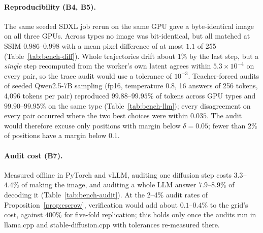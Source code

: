 \documentclass[11pt,a4paper]{article}
\theoremstyle{definition}
\theoremstyle{plain}
\begin{document}
\begin{table}[ht]
\centering
\caption{SDXL across GPU types (4 prompts, fixed seeds, CPU-generated initial noise). The last column
is the largest relative error when one GPU recomputes a single denoising step of another GPU's trace.}\label{tab:bench-diff}
\small
\resizebox{\linewidth}{!}{}
\medskip
\caption{Cost of one audit (B7). Diffusion: recomputing one denoising step, as a fraction of generating
the image. LLM: one teacher-forced pass (fp16) over a 256-token answer, as a fraction of vLLM decoding the
same number of tokens at batch 1 (4-bit AWQ, Table~\ref{tab:bench-throughput}); an fp16 decode would make the
fraction smaller.}\label{tab:bench-audit}
\small
\resizebox{\linewidth}{!}{}
\end{table}

\paragraph{Reproducibility (B4, B5).} The same seeded SDXL job rerun on the same GPU gave a byte-identical image
on all three GPUs. Across types no image was bit-identical, but all matched at SSIM $0.986$--$0.998$ with a mean
pixel difference of at most $1.1$ of 255 (Table~\ref{tab:bench-diff}). Whole trajectories drift about $1\%$ by
the last step, but a \emph{single} step recomputed from the worker's own latent agrees within
$5.3\times10^{-4}$ on every pair, so the trace audit would use a tolerance of $10^{-3}$. Teacher-forced audits of
seeded Qwen2.5-7B sampling (fp16, temperature 0.8, 16 answers of 256 tokens, 4{,}096 tokens per pair)
reproduced $99.88$--$99.95\%$ of tokens across GPU types and $99.90$--$99.95\%$ on the same type
(Table~\ref{tab:bench-llm}); every disagreement on every pair occurred where the two best choices were
within $0.035$. The audit would therefore
excuse only positions with margin below $\delta=0.05$; fewer than $2\%$ of positions have a margin below
$0.1$.

\paragraph{Audit cost (B7).} Measured offline in PyTorch and vLLM, auditing one diffusion step costs $3.3$--$4.4\%$ of making the image, and auditing
a whole LLM answer $7.9$--$8.9\%$ of decoding it (Table~\ref{tab:bench-audit}). At the 2--4\% audit rates of
Proposition~\ref{prop:escrow}, verification would add about $0.1$--$0.4\%$ to the grid's cost, against $400\%$ for
five-fold replication; this holds only once the audits run in llama.cpp and stable-diffusion.cpp with tolerances
re-measured there.
\end{document}
